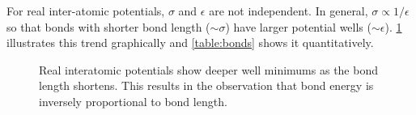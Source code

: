 \documentclass[twocolumn]{memoir} %
\begin{document}
For real inter-atomic potentials, $\sigma$ and $\epsilon$ are not independent.  In general, 
$\sigma \propto 1/\epsilon$ so that bonds with shorter bond length ($\sim \sigma$) have larger
potential wells ($\sim \epsilon$).  \cref{fig:lj_bonds} illustrates this trend graphically and 
\cref{table:bonds} shows it quantitatively.  

\begin{figure}[H]
    \caption{Real interatomic potentials show deeper well minimums as the bond length shortens.  This results
    in the observation that bond energy is inversely proportional to bond length.}
    \label{fig:lj_bonds}
\end{figure}
\end{document}
